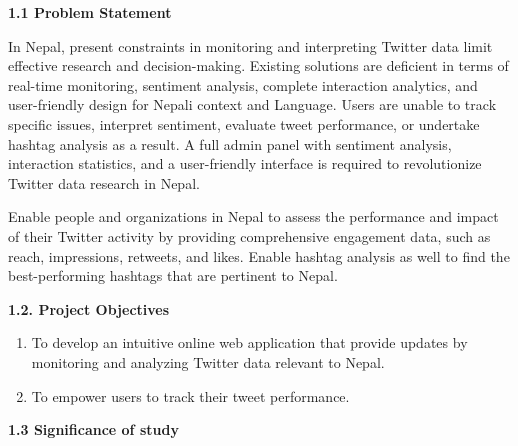 \documentclass[a4paper,12pt]{article}
\begin{document}
{{{  \begin{flushleft}
			\fontsize{13}{15}\selectfont\textbf{1.1 Problem Statement }
			\label{problem}
		\end{flushleft}

								
		
								
		In Nepal, present constraints in monitoring and interpreting Twitter data limit effective research and decision-making. Existing solutions are deficient in terms of real-time monitoring, sentiment analysis, complete interaction analytics, and user-friendly design for Nepali context and Language. Users are unable to track specific issues, interpret sentiment, evaluate tweet performance, or undertake hashtag analysis as a result. A full admin panel with sentiment analysis, interaction statistics, and a user-friendly interface is required to revolutionize Twitter data research in Nepal.
								
		Enable people and organizations in Nepal to assess the performance and impact of their Twitter activity by providing comprehensive engagement data, such as reach, impressions, retweets, and likes. Enable hashtag analysis as well to find the best-performing hashtags that are pertinent to Nepal.
								
				
				    
				
						
		\begin{flushleft}
			\fontsize{13}{15}\selectfont\textbf{1.2. Project Objectives}
			\label{page2}
		\end{flushleft}
								
		\begin{enumerate}
			\item To develop an intuitive online web application that provide  updates by monitoring and analyzing Twitter data relevant to Nepal.
			         
			\item To empower users to track their tweet performance.
			      						
		\end{enumerate}
								
								
								
		
								
		\begin{flushleft}
			\fontsize{13}{15}\selectfont\textbf{1.3 Significance of study}
			\phantomsection
			\label{page3}
		\end{flushleft}
								
}}}
\end{document}
